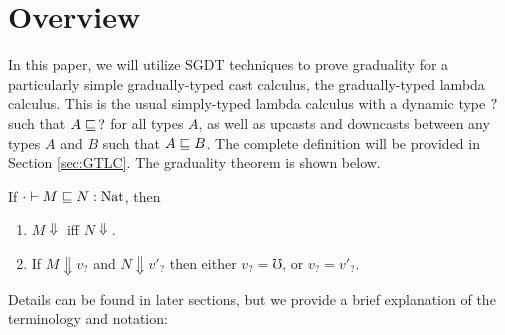 \section{Overview}\label{sec:overview}



In this paper, we will utilize SGDT techniques to prove graduality for a particularly
simple gradually-typed cast calculus, the gradually-typed lambda calculus.
This is the usual simply-typed lambda calculus with a dynamic type $?$ such that
$A \sqsubseteq\, ?$ for all types $A$, as well as upcasts and downcasts between any types
$A$ and $B$ such that $A \sqsubseteq B$. The complete definition will be provided in
Section \ref{sec:GTLC}.
The graduality theorem is shown below.




\begin{theorem}[Graduality]
  If $\cdot \vdash M \sqsubseteq N : \text{Nat}$, then
  \begin{enumerate}
    \item $M \Downarrow$ iff $N \Downarrow$.
    \item If $M \Downarrow v_?$ and $N \Downarrow v'_?$ then either $v_? = \mho$, or $v_? = v'_?$.
  \end{enumerate}
\end{theorem}

Details can be found in later sections, but we provide a brief explanation of the terminology and notation:

